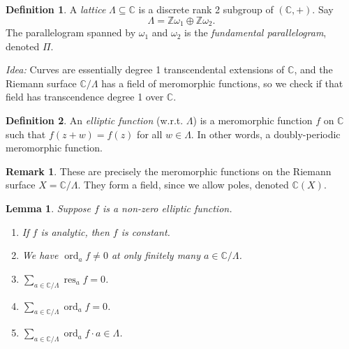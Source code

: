 \documentclass[a4paper]{article}
\newtheorem{lemma}[theorem]{Lemma}
\theoremstyle{definition}
\newtheorem*{definition}{Definition}
\newtheorem*{remark}{Remark}
\DeclareMathOperator{\ord}{ord}
\DeclareMathOperator{\res}{res}
\newcommand{\Z}{\mathbb{Z}}
\newcommand{\C}{\mathbb{C}}
\begin{document}
\begin{definition}
    A \emph{lattice} $\Lambda\subseteq\C$ is a discrete rank 2 subgroup of
    $(\C,+)$. Say
    \begin{equation*}
        \Lambda = \Z\omega_1\oplus\Z\omega_2.
    \end{equation*}
    The parallelogram spanned by $\omega_1$ and $\omega_2$ is the
    \emph{fundamental parallelogram}, denoted $\Pi$.
\end{definition}

\textit{Idea:} Curves are essentially degree 1 transcendental extensions of
$\C$, and the Riemann surface $\C/\Lambda$ has a field of meromorphic functions,
so we check if that field has transcendence degree 1 over $\C$.

\begin{definition}
    An \emph{elliptic function} (w.r.t. $\Lambda$) is a meromorphic function $f$
    on $\C$ such that $f(z+w)=f(z)$ for all $w\in\Lambda$. In other words, a
    doubly-periodic meromorphic function.
\end{definition}

\begin{remark}
    These are precisely the meromorphic functions on the Riemann surface
    $X=\C/\Lambda$. They form a field, since we allow poles, denoted $\C(X)$.
\end{remark}

\begin{lemma}
    Suppose $f$ is a non-zero elliptic function.
    \begin{enumerate}[label=(\roman*)]
        \item If $f$ is analytic, then $f$ is constant.
        \item We have $\ord_af\ne0$ at only finitely many $a\in\C/\Lambda$.
        \item $\sum_{a\in\C/\Lambda}\res_af=0$.
        \item $\sum_{a\in\C/\Lambda}\ord_af=0$.
        \item $\sum_{a\in\C/\Lambda}\ord_af\cdot a\in\Lambda$.
    \end{enumerate}
\end{lemma}
\end{document}
